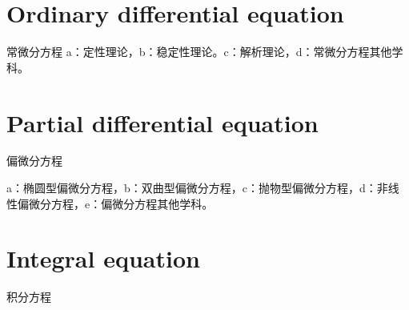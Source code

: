 
\chapter{Ordinary differential equation}

常微分方程
a：定性理论，b：稳定性理论。c：解析理论，d：常微分方程其他学科。

\chapter{Partial differential equation}
偏微分方程

a：椭圆型偏微分方程，b：双曲型偏微分方程，c：抛物型偏微分方程，d：非线性偏微分方程，e：偏微分方程其他学科。


\chapter{Integral equation}

积分方程

